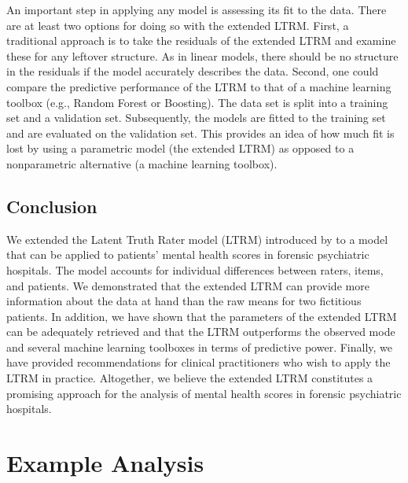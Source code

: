 \documentclass[a4paper,usenames,dvipsnames]{article}
\newenvironment{revision}{\color{teal}}{\color{black}}
\begin{document}
\begin{revision}
An important step in applying any model is assessing its fit to the data.
There are at least two options for doing so with the extended LTRM.
First, a traditional approach is to take the residuals of the extended LTRM and examine these for any leftover structure.
As in linear models, there should be no structure in the residuals if the model accurately describes the data.
Second, one could compare the predictive performance of the LTRM to that of a machine learning toolbox (e.g., Random Forest or Boosting).
The data set is split into a training set and a validation set. 
Subsequently, the models are fitted to the training set and are evaluated on the validation set.
This provides an idea of how much fit is lost by using a parametric model (the extended LTRM) as opposed to a nonparametric alternative (a machine learning toolbox).
\end{revision}%


\subsection*{Conclusion}
We extended the Latent Truth Rater model (LTRM) introduced by  to a model that can be applied to patients' mental health scores in forensic psychiatric hospitals. The model accounts for individual differences between raters, items, and patients. We demonstrated that the extended LTRM can provide more information about the data at hand than the raw means for two fictitious patients. In addition, we have shown that the parameters of the extended LTRM can be adequately retrieved and that the LTRM outperforms the observed mode and several machine learning toolboxes in terms of predictive power. Finally, we have provided recommendations for clinical practitioners who wish to apply the LTRM in practice. \begin{revision}Altogether, we believe the extended LTRM constitutes a promising approach for the analysis of mental health scores in forensic psychiatric hospitals.\end{revision}





\newpage
\appendix
{}

\section{Example Analysis}
\end{document}
